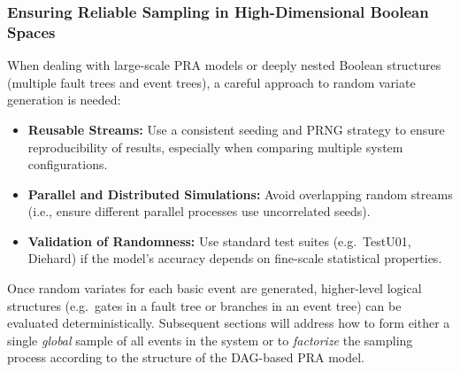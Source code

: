 \subsubsection*{Ensuring Reliable Sampling in High-Dimensional Boolean Spaces}
When dealing with large-scale PRA models or deeply nested Boolean structures (multiple fault trees and event trees), a careful approach to random variate generation is needed:
\begin{itemize}
\item \textbf{Reusable Streams:} Use a consistent seeding and PRNG strategy to ensure reproducibility of results, especially when comparing multiple system configurations.
\item \textbf{Parallel and Distributed Simulations:} Avoid overlapping random streams (i.e., ensure different parallel processes use uncorrelated seeds).
\item \textbf{Validation of Randomness:} Use standard test suites (e.g.\ TestU01, Diehard) if the model’s accuracy depends on fine-scale statistical properties.
\end{itemize}
Once random variates for each basic event are generated, higher-level logical structures (e.g.\ gates in a fault tree or branches in an event tree) can be evaluated deterministically.  Subsequent sections will address how to form either a single \emph{global} sample of all events in the system or to \emph{factorize} the sampling process according to the structure of the DAG-based PRA model.